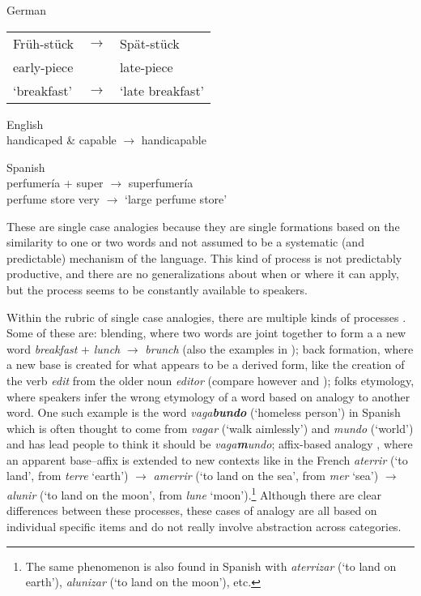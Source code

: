 \begin{exe}
    \ex \label{exe-germ-en1} German\\
    \begin{tabular}[t]{@{}lcl}
      Früh-stück & $\rightarrow$& Spät-stück\\
      early-piece &&late-piece\\
      `breakfast' &$\rightarrow$& `late breakfast'\\
    \end{tabular}
    \ex English\\
    handicaped \& capable  $\rightarrow$ handicapable

    \ex \label{blends-spanish} Spanish\\
    \gll perfumería  + super $\rightarrow$ superfumería \\
    {perfume store} {} very $\rightarrow$ {`large perfume store'}\\

\end{exe}


These are single case analogies because they are single formations based on the similarity to one or two words and not assumed to be a systematic (and predictable) mechanism of the language. This kind of process is not predictably productive, and there are no generalizations about when or where it can apply, but the process seems to be constantly available to speakers. 

Within the rubric of single case analogies, there are multiple kinds of processes \autocite[278]{Anderson.2015}. Some of these are: blending, where two words are joint together to form a a new word \textit{breakfast} + \textit{lunch} $\rightarrow$ \textit{brunch} (also the examples in ); back formation, where a new base is created for what appears to be a derived form, like the creation of the verb \textit{edit} from the older noun \textit{editor} (compare however \citealt{vanMarle.1985} and \citealt{Becker.1993}); folks etymology, where speakers infer the wrong etymology of a word based on analogy to another word. One such example is the word \textit{vaga\textbf{bundo}} (`homeless person') in Spanish which is often thought to come from \textit{vagar} (`walk aimlessly') and \textit{mundo} (`world') and has lead people to think it should be \textit{vaga\textbf{m}undo}; affix-based analogy \autocite{Kilani-Schoch.2005}, where an apparent base--affix is extended to new contexts like in the French \textit{aterrir} (`to land', from \textit{terre} `earth') $\rightarrow$ \textit{amerrir} (`to land on the sea', from \textit{mer} `sea') $\rightarrow$ \textit{alunir} (`to land on the moon', from \textit{lune} `moon').\footnote{The same phenomenon is also found in Spanish with \textit{aterrizar} (`to land on earth'), \textit{alunizar} (`to land on the moon'), etc.} Although there are clear differences between these processes, these cases of analogy are all based on individual specific items and do not really involve abstraction across categories.

